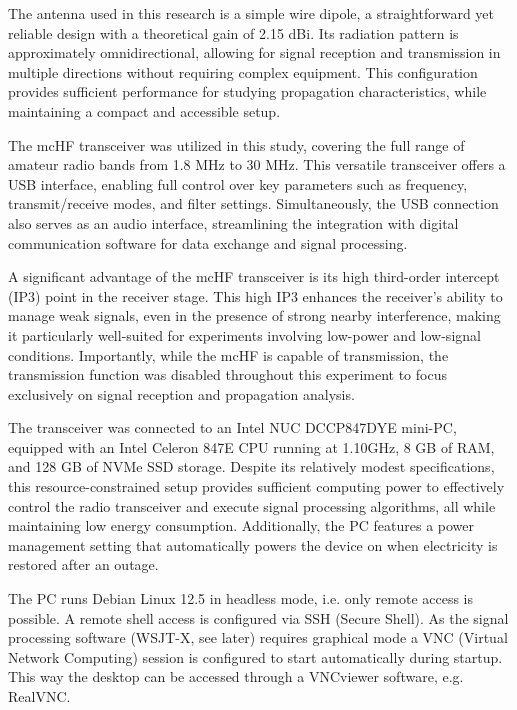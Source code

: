 \documentclass[conference]{IEEEtran}
\begin{document}
The antenna used in this research is a simple wire dipole, a straightforward
yet reliable design with a theoretical gain of 2.15 dBi. Its radiation pattern
is approximately omnidirectional, allowing for signal reception and
transmission in multiple directions without requiring complex equipment. This
configuration provides sufficient performance for studying propagation
characteristics, while maintaining a compact and accessible setup.

The mcHF transceiver was utilized in this study, covering the full range of
amateur radio bands from 1.8 MHz to 30 MHz. This versatile transceiver offers a
USB interface, enabling full control over key parameters such as frequency,
transmit/receive modes, and filter settings. Simultaneously, the USB connection
also serves as an audio interface, streamlining the integration with digital
communication software for data exchange and signal processing.

A significant advantage of the mcHF transceiver is its high third-order
intercept (IP3) point in the receiver stage. This high IP3 enhances the
receiver’s ability to manage weak signals, even in the presence of strong
nearby interference, making it particularly well-suited for experiments
involving low-power and low-signal conditions. Importantly, while the mcHF is
capable of transmission, the transmission function was disabled throughout this
experiment to focus exclusively on signal reception and propagation analysis.

The transceiver was connected to an Intel NUC DCCP847DYE mini-PC, equipped with
an Intel Celeron 847E CPU running at 1.10GHz, 8 GB of RAM, and 128 GB of NVMe
SSD storage. Despite its relatively modest specifications, this
resource-constrained setup provides sufficient computing power to effectively
control the radio transceiver and execute signal processing algorithms, all
while maintaining low energy consumption. Additionally, the PC features a power
management setting that automatically powers the device on when electricity is
restored after an outage.

The PC runs Debian Linux 12.5 in headless mode, i.e. only remote access is
possible. A remote shell access is configured via SSH (Secure Shell).
As the signal processing
software (WSJT-X, see later) requires graphical mode a VNC (Virtual Network Computing)
\cite{richardson1998}
session is configured
to start automatically during startup. This way the desktop can be accessed
through a VNCviewer software, e.g. RealVNC. 
\end{document}
